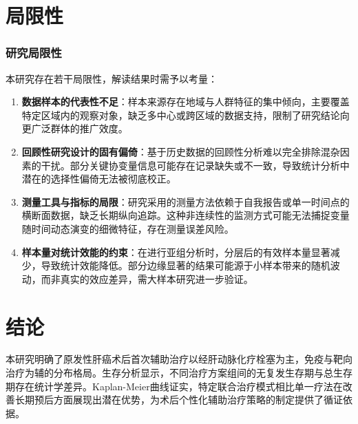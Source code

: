 \documentclass{article}
\begin{document}
\section{局限性}
\subsubsection{研究局限性}
本研究存在若干局限性，解读结果时需予以考量：
\begin{enumerate}
\item \textbf{数据样本的代表性不足}：样本来源存在地域与人群特征的集中倾向，主要覆盖特定区域内的观察对象，缺乏多中心或跨区域的数据支持，限制了研究结论向更广泛群体的推广效度。
\item \textbf{回顾性研究设计的固有偏倚}：基于历史数据的回顾性分析难以完全排除混杂因素的干扰。部分关键协变量信息可能存在记录缺失或不一致，导致统计分析中潜在的选择性偏倚无法被彻底校正。
\item \textbf{测量工具与指标的局限}：研究采用的测量方法依赖于自我报告或单一时间点的横断面数据，缺乏长期纵向追踪。这种非连续性的监测方式可能无法捕捉变量随时间动态演变的细微特征，存在测量误差风险。
\item \textbf{样本量对统计效能的约束}：在进行亚组分析时，分层后的有效样本量显著减少，导致统计效能降低。部分边缘显著的结果可能源于小样本带来的随机波动，而非真实的效应差异，需大样本研究进一步验证。
\end{enumerate}

\section{结论}
本研究明确了原发性肝癌术后首次辅助治疗以经肝动脉化疗栓塞为主，免疫与靶向治疗为辅的分布格局。生存分析显示，不同治疗方案组间的无复发生存期与总生存期存在统计学差异。Kaplan-Meier曲线证实，特定联合治疗模式相比单一疗法在改善长期预后方面展现出潜在优势，为术后个性化辅助治疗策略的制定提供了循证依据。
\end{document}
